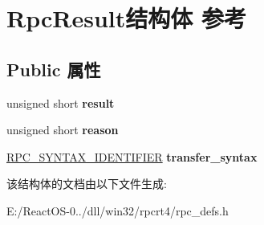 \hypertarget{struct_rpc_result}{}\section{Rpc\+Result结构体 参考}
\label{struct_rpc_result}
\subsection*{Public 属性}
\begin{DoxyCompactItemize}
\item 
\mbox{\label{struct_rpc_result_a50ca2e5684cbec150397465faae90dc3}} 
unsigned short {\bfseries result}
\item 
\mbox{\label{struct_rpc_result_ac379626b0938316a26d71812805af75c}} 
unsigned short {\bfseries reason}
\item 
\mbox{\label{struct_rpc_result_aac13cae9a94737b0fd6d7a1342feb9bb}} 
\hyperlink{struct___r_p_c___s_y_n_t_a_x___i_d_e_n_t_i_f_i_e_r}{R\+P\+C\+\_\+\+S\+Y\+N\+T\+A\+X\+\_\+\+I\+D\+E\+N\+T\+I\+F\+I\+ER} {\bfseries transfer\+\_\+syntax}
\end{DoxyCompactItemize}


该结构体的文档由以下文件生成\+:\begin{DoxyCompactItemize}
\item 
E\+:/\+React\+O\+S-\/0../dll/win32/rpcrt4/rpc\+\_\+defs.\+h\end{DoxyCompactItemize}
